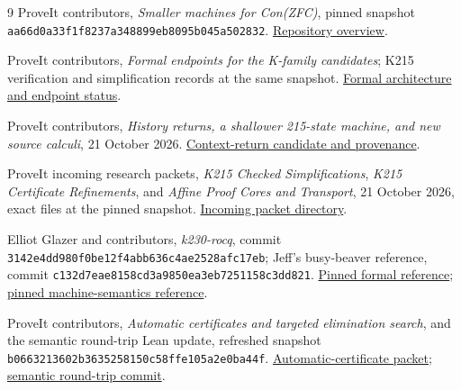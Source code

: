 \documentclass[11pt]{article}
\begin{document}
\begingroup\footnotesize\raggedright\setlength{\parskip}{0pt}
\begin{thebibliography}{9}\setlength{\itemsep}{2pt}
ProveIt contributors, \emph{Smaller machines for Con(ZFC)}, pinned snapshot
\texttt{aa66d0a33f1f8237a348899eb8095b045a502832}.
\href{https://github.com/VladimirReshetnikov/ProveIt/blob/aa66d0a33f1f8237a348899eb8095b045a502832/Computability/BusyBeaver/Research/ZFC/README.md}{Repository overview}.

ProveIt contributors, \emph{Formal endpoints for the K-family candidates}; K215 verification and simplification records at the same snapshot.
\href{https://github.com/VladimirReshetnikov/ProveIt/blob/aa66d0a33f1f8237a348899eb8095b045a502832/Computability/BusyBeaver/Research/ZFC/k225-formal/README.md}{Formal architecture and endpoint status}.

ProveIt contributors, \emph{History returns, a shallower 215-state machine, and new source calculi}, 21 October 2026.
\href{https://github.com/VladimirReshetnikov/ProveIt/blob/aa66d0a33f1f8237a348899eb8095b045a502832/Computability/BusyBeaver/Research/ZFC/candidate-k215/alternatives/context-returns/README.md}{Context-return candidate and provenance}.

ProveIt incoming research packets, \emph{K215 Checked Simplifications}, \emph{K215 Certificate Refinements}, and \emph{Affine Proof Cores and Transport}, 21 October 2026, exact files at the pinned snapshot.
\href{https://github.com/VladimirReshetnikov/ProveIt/tree/aa66d0a33f1f8237a348899eb8095b045a502832/docs/incoming}{Incoming packet directory}.

Elliot Glazer and contributors, \emph{k230-rocq}, commit\newline
\texttt{3142e4dd980f0be12f4abb636c4ae2528afc17eb}; Jeff's busy-beaver reference, commit
\texttt{c132d7eae8158cd3a9850ea3eb7251158c3dd821}.
\href{https://github.com/elliotglazer/k230-rocq/tree/3142e4dd980f0be12f4abb636c4ae2528afc17eb}{Pinned formal reference};
\href{https://github.com/jeff87654/busy-beaver/tree/c132d7eae8158cd3a9850ea3eb7251158c3dd821}{pinned machine-semantics reference}.

ProveIt contributors, \emph{Automatic certificates and targeted elimination search}, and the semantic round-trip Lean update, refreshed snapshot
\texttt{b0663213602b3635258150c58ffe105a2e0ba44f}.
\href{https://github.com/VladimirReshetnikov/ProveIt/blob/b0663213602b3635258150c58ffe105a2e0ba44f/Computability/BusyBeaver/Research/ZFC/k225-formal/verification/k215/simplification/proposals/automatic-certificates/README.md}{Automatic-certificate packet};
\href{https://github.com/VladimirReshetnikov/ProveIt/commit/b0663213602b3635258150c58ffe105a2e0ba44f}{semantic round-trip commit}.



\end{thebibliography}
\end{document}
